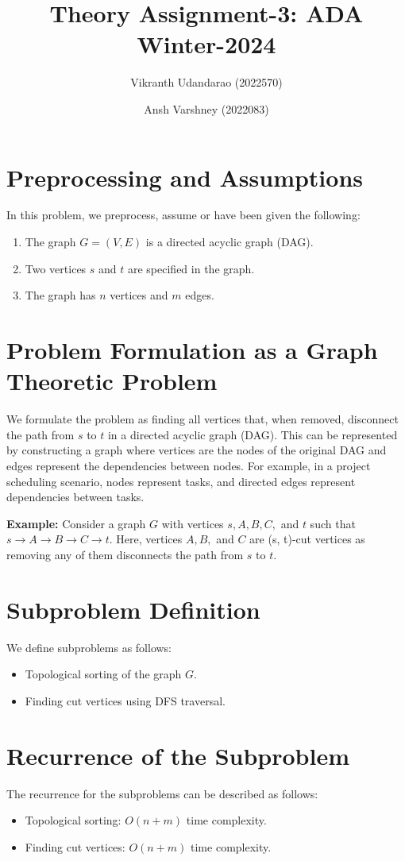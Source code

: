 \documentclass{article}
\title{Theory Assignment-3: ADA Winter-2024}
\author{Vikranth Udandarao (2022570) \and Ansh Varshney (2022083)}
\date{}
\begin{document}
\maketitle

\section{Preprocessing and Assumptions}
    In this problem, we preprocess, assume or have been given the following:

    \begin{enumerate}
        \item The graph $G = (V, E)$ is a directed acyclic graph (DAG).
        \item Two vertices $s$ and $t$ are specified in the graph.
        \item The graph has $n$ vertices and $m$ edges.
    \end{enumerate}

\section{Problem Formulation as a Graph Theoretic Problem}
    We formulate the problem as finding all vertices that, when removed, disconnect the path from $s$ to $t$ in a directed acyclic graph (DAG). This can be represented by constructing a graph where vertices are the nodes of the original DAG and edges represent the dependencies between nodes. For example, in a project scheduling scenario, nodes represent tasks, and directed edges represent dependencies between tasks.

    \textbf{Example:} Consider a graph $G$ with vertices $s, A, B, C,$ and $t$ such that $s \rightarrow A \rightarrow B \rightarrow C \rightarrow t$. Here, vertices $A, B,$ and $C$ are (s, t)-cut vertices as removing any of them disconnects the path from $s$ to $t$.

\section{Subproblem Definition}
    We define subproblems as follows:
    \begin{itemize}
        \item Topological sorting of the graph $G$.
        \item Finding cut vertices using DFS traversal.
    \end{itemize}

\section{Recurrence of the Subproblem}
    The recurrence for the subproblems can be described as follows:
    \begin{itemize}
        \item Topological sorting: $O(n + m)$ time complexity.
        \item Finding cut vertices: $O(n + m)$ time complexity.
    \end{itemize}
\end{document}
